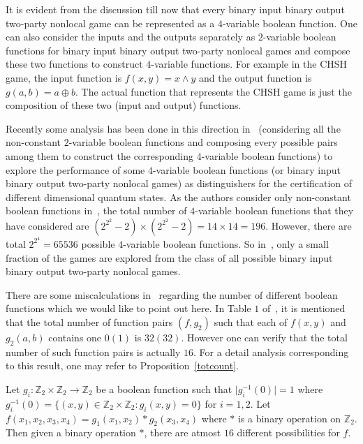 \documentclass[]{svjour3}
\begin{document}
It is evident from the discussion till now that every binary input binary output two-party nonlocal game can be represented as a $4$-variable boolean function. One can also consider the inputs and the outputs separately as $2$-variable boolean functions for binary input binary output two-party nonlocal games and compose these two functions to construct $4$-variable functions. For example in the CHSH game, the input function is $f(x,y)=x \wedge y$ and the output function is $g(a,b)=a\oplus b$. The actual function that represents the CHSH game is just the composition of these two (input and output) functions.

Recently some analysis has been done in this direction in~\cite{NGA19} (considering all the non-constant $2$-variable boolean functions and composing every possible pairs among them to construct the corresponding $4$-variable boolean functions) to explore the performance of some $4$-variable boolean functions (or binary input binary output two-party nonlocal games) as distinguishers for the certification of different dimensional quantum states. As the authors consider only non-constant boolean functions in~\cite{NGA19}, the total number of $4$-variable boolean functions that they have considered are $(2^{2^2}-2)\times(2^{2^2}-2) = 14\times14 = 196$. However, there are total $2^{2^4}=65536$ possible $4$-variable boolean functions. So in~\cite{NGA19}, only a small fraction of the games are explored from the class of all possible binary input binary output two-party nonlocal games.

There are some miscalculations in~\cite[Table 1]{NGA19} regarding the number of different boolean functions which we would like to point out here. In Table $1$ of~\cite{NGA19}, it is mentioned that the total number of function pairs $(f,g_2)$ such that each of $f(x,y)$ and $g_2(a,b)$ contains one $0 (1)$ is $32 (32)$. However one can verify that the total number of such function pairs is actually $16$. For a detail analysis corresponding to this result, one may refer to Proposition~\ref{totcount}.


\begin{proposition}
	\label{totcount}
	Let $g_i: \mathbb{Z}_2 \times \mathbb{Z}_2 \rightarrow \mathbb{Z}_2$ be a boolean function such that $\mid g_i^{-1}(0) \mid = 1$ where $g_i^{-1}(0) = \{ (x, y) \in \mathbb{Z}_2 \times \mathbb{Z}_2: g_i(x, y) = 0 \}$ for $i= 1, 2$. Let $f(x_1, x_2, x_3, x_4) = g_1 (x_1, x_2) * g_2(x_3, x_4)$ where $*$ is a binary operation on $\mathbb{Z}_2$. Then given a binary operation $*$, there are atmost $16$ different possibilities for $f$.   
\end{proposition}
\end{document}
